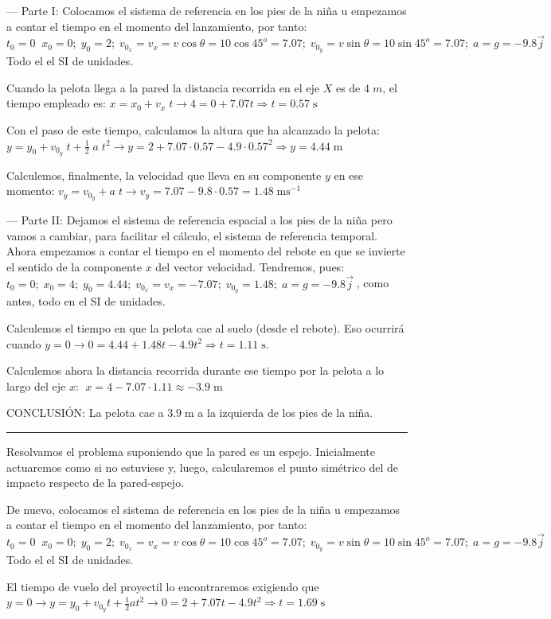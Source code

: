 --- Parte I:  Colocamos el sistema de referencia en los pies de la niña u empezamos a contar el tiempo en el momento del lanzamiento, por tanto: $t_0=0\;\; x_0=0;\; y_0=2;\; v_{0_x}=v_x=v\cos \theta=10\cos 45^o=7.07;\; v_{0_y}=v\sin \theta=10\sin 45^o=7.07;\; a=g=-9.8\vec j\;$ Todo el el SI de unidades.

Cuando la pelota llega a la pared la distancia recorrida en el eje $X$ es de $4\;m$, el tiempo empleado es: $x=x_0+v_x\;t \to 4=0+7.07t \Rightarrow t=0.57\; \mathrm{s}$

Con el paso de este tiempo, calculamos la altura que ha alcanzado la pelota: $y=y_0+v_{0_y}\;t+\frac 1 2 \;a\;t^2 \to y=2+7.07\cdot 0.57-4.9\cdot 0.57^2 \Rightarrow y=4.44\; \mathrm{m}$

Calculemos, finalmente, la velocidad que lleva en su componente $y$ en ese momento: $v_y=v_{0_y}+a\; t \to v_y=7.07-9.8\cdot 0.57=1.48\; \mathrm{ms}^{-1}$

--- Parte II: Dejamos el sistema de referencia espacial a los pies de la niña pero vamos a cambiar, para facilitar el cálculo, el sistema de referencia temporal. Ahora empezamos a contar el tiempo en el momento del rebote en que se invierte el sentido de la componente $x$ del vector velocidad. Tendremos, pues: $t_0=0;\; x_0=4;\; y_0=4.44;\; v_{0_x}=v_x=-7.07;\; v_{0_y}=1.48;\; a=g=-9.8\vec j\;$, como antes, todo en el SI de unidades.

Calculemos el tiempo en que la pelota cae al suelo (desde el rebote). Eso ocurrirá cuando $y=0\to 0=4.44+1.48t-4.9t^2\Rightarrow t=1.11\; \mathrm{s}$.

Calculemos ahora la distancia recorrida durante ese tiempo por la pelota a lo largo del eje $x$: $\;x=4-7.07\cdot 1.11\approx -3.9\;\mathrm{m}$

CONCLUSIÓN: La pelota cae a $3.9\;\mathrm{m}$ a la izquierda de los pies de la niña.

\rule{150pt}{0.4pt} 

Resolvamos el problema suponiendo que la pared es un espejo. Inicialmente actuaremos como si no estuviese y, luego, calcularemos el punto simétrico del de impacto respecto de la pared-espejo.

De nuevo, colocamos el sistema de referencia en los pies de la niña u empezamos a contar el tiempo en el momento del lanzamiento, por tanto: $t_0=0\;\; x_0=0;\; y_0=2;\; v_{0_x}=v_x=v\cos \theta=10\cos 45^o=7.07;\; v_{0_y}=v\sin \theta=10\sin 45^o=7.07;\; a=g=-9.8\vec j\;$ Todo el el SI de unidades.

El tiempo de vuelo del proyectil lo encontraremos exigiendo que $y=0 \to y=y_0+v_{0_y}t+\frac 1 2 a t^2 \to 0=2+7.07t-4.9t^2 \Rightarrow t=1.69\;\mathrm{s}$

